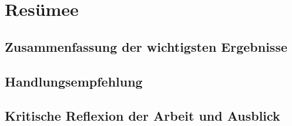 \section{Resümee}
\subsection{Zusammenfassung der wichtigsten Ergebnisse}
\subsection{Handlungsempfehlung}
\subsection{Kritische Reflexion der Arbeit und Ausblick}
